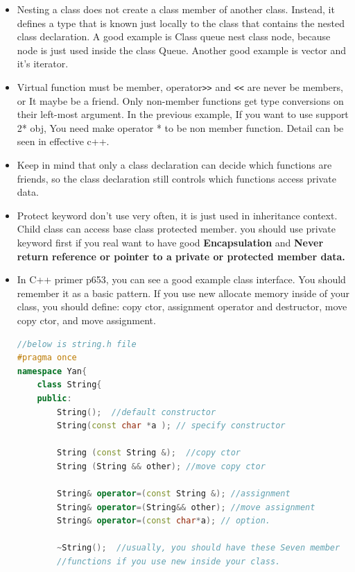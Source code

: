 \documentclass[a4paper,11pt,twoside]{book}
\begin{document}
\begin{itemize}
	
	\item Nesting a class does not create a class member of another class. Instead, it defines a type that is known just locally to the class that contains the nested class declaration.  A good example is Class queue nest class node,  because node is just used inside the class Queue. Another good example is vector and it's iterator.
	
	\item Virtual function must be member, operator\verb=>>= and \verb=<<= are never be members, or It maybe be a friend. Only non-member functions get type conversions on their left-most argument.  In the previous example, If you want to use support 2* obj, You need make operator * to be non member function.  Detail can be seen in effective c++.
	
	\item Keep in mind that only a class declaration can decide which functions are friends, so the class declaration still controls which functions access private data.
	
	\item Protect keyword don't use very often, it is just used in inheritance context. Child class can access base class protected member. you should use private keyword first if you real want to have good \textbf{Encapsulation} and \textbf{Never return reference or pointer to a private or protected member data.}
	
	\item In C++ primer p653, you can see a good example class interface. You should remember it as a basic pattern.  If you use new allocate memory inside of your class, you should define: copy ctor, assignment operator and destructor, move copy ctor, and move assignment.
	
\begin{lstlisting}[frame=single, language=c++]
//below is string.h file
#pragma once
namespace Yan{
	class String{
	public:
		String();  //default constructor
		String(const char *a ); // specify constructor
		
		String (const String &);  //copy ctor
		String (String && other); //move copy ctor
		
		String& operator=(const String &); //assignment
		String& operator=(String&& other); //move assignment
		String& operator=(const char*a); // option.
		
		~String();  //usually, you should have these Seven member
		//functions if you use new inside your class.
		

\end{lstlisting}
\end{itemize}
\end{document}
